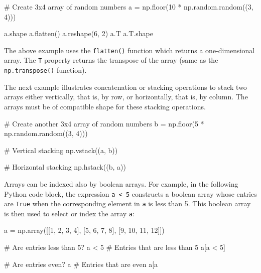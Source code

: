 \begin{pythoncode}
# Create 3x4 array of random numbers
a = np.floor(10 * np.random.random((3, 4)))

a.shape
a.flatten()
a.reshape(6, 2)
a.T
a.T.shape
\end{pythoncode}

The above example uses the \texttt{flatten()} function which returns a one-dimensional array. The \texttt{T} property returns the transpose of the array (same as the \texttt{np.transpose()} function). %

The next example illustrates concatenation or stacking operations to stack two arrays either vertically, that is, by row, or horizontally, that is, by column. The arrays must be of compatible shape for these stacking operations. 

\begin{pythoncode}
# Create another 3x4 array of random numbers
b = np.floor(5 * np.random.random((3, 4)))

# Vertical stacking
np.vstack((a, b))

# Horizontal stacking
np.hstack((b, a))
\end{pythoncode}

Arrays can be indexed also by boolean arrays. For example, in the following Python code block, the expression \texttt{a < 5} constructs a boolean array whose entries are \texttt{True} when the corresponding element in \texttt{a} is less than 5. This boolean array is then used to select or index the array \texttt{a}:

\begin{pythoncode}
a = np.array([[1,  2,  3,  4], 
              [5,  6,  7,  8], 
              [9, 10, 11, 12]])

# Are entries less than 5?
a < 5
# Entries that are less than 5
a[a < 5]

# Are entries even?
a%
# Entries that are even
a[a%
\end{pythoncode}



